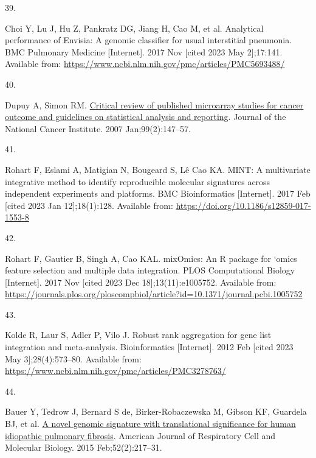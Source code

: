 \documentclass[
]{article}
\newlength{\cslhangindent}
\newlength{\csllabelwidth}
\newlength{\cslentryspacingunit} %
\newenvironment{CSLReferences}[2] %
 {%
  \setlength{\parindent}{0pt}
  \ifodd #1
  \let\oldpar\par
  \def\par{\hangindent=\cslhangindent\oldpar}
  \fi
  \setlength{\parskip}{#2\cslentryspacingunit}
 }%
 {}
\newcommand{\CSLLeftMargin}[1]{\parbox[t]{\csllabelwidth}{#1}}
\newcommand{\CSLRightInline}[1]{\parbox[t]{\linewidth - \csllabelwidth}{#1}\break}
\begin{document}
\begin{CSLReferences}{0}{0}
\leavevmode{}%
\CSLLeftMargin{39. }%
\CSLRightInline{Choi Y, Lu J, Hu Z, Pankratz DG, Jiang H, Cao M, et al. Analytical performance of {Envisia}: A genomic classifier for usual interstitial pneumonia. BMC Pulmonary Medicine {[}Internet{]}. 2017 Nov {[}cited 2023 May 2{]};17:141. Available from: \url{https://www.ncbi.nlm.nih.gov/pmc/articles/PMC5693488/}}

\leavevmode{}%
\CSLLeftMargin{40. }%
\CSLRightInline{Dupuy A, Simon RM. \href{https://doi.org/10.1093/jnci/djk018}{Critical review of published microarray studies for cancer outcome and guidelines on statistical analysis and reporting}. Journal of the National Cancer Institute. 2007 Jan;99(2):147--57. }

\leavevmode{}%
\CSLLeftMargin{41. }%
\CSLRightInline{Rohart F, Eslami A, Matigian N, Bougeard S, Lê Cao KA. {MINT}: A multivariate integrative method to identify reproducible molecular signatures across independent experiments and platforms. BMC Bioinformatics {[}Internet{]}. 2017 Feb {[}cited 2023 Jan 12{]};18(1):128. Available from: \url{https://doi.org/10.1186/s12859-017-1553-8}}

\leavevmode{}%
\CSLLeftMargin{42. }%
\CSLRightInline{Rohart F, Gautier B, Singh A, Cao KAL. {mixOmics}: {An} {R} package for `omics feature selection and multiple data integration. PLOS Computational Biology {[}Internet{]}. 2017 Nov {[}cited 2023 Dec 18{]};13(11):e1005752. Available from: \url{https://journals.plos.org/ploscompbiol/article?id=10.1371/journal.pcbi.1005752}}

\leavevmode{}%
\CSLLeftMargin{43. }%
\CSLRightInline{Kolde R, Laur S, Adler P, Vilo J. Robust rank aggregation for gene list integration and meta-analysis. Bioinformatics {[}Internet{]}. 2012 Feb {[}cited 2023 May 3{]};28(4):573--80. Available from: \url{https://www.ncbi.nlm.nih.gov/pmc/articles/PMC3278763/}}

\leavevmode{}%
\CSLLeftMargin{44. }%
\CSLRightInline{Bauer Y, Tedrow J, Bernard S de, Birker-Robaczewska M, Gibson KF, Guardela BJ, et al. \href{https://doi.org/10.1165/rcmb.2013-0310OC}{A novel genomic signature with translational significance for human idiopathic pulmonary fibrosis}. American Journal of Respiratory Cell and Molecular Biology. 2015 Feb;52(2):217--31. }


\end{CSLReferences}
\end{document}
